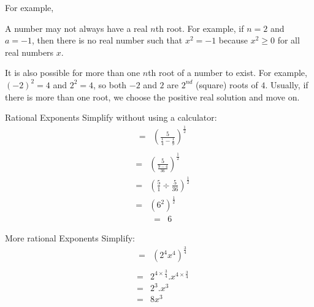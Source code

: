For example,

A number may not always have a real $n$th root. For example, if $n=2$ and
$a=-1$, then there is no real number such that $x^2=-1$ because $x^2 \geq 0 $ for all real numbers $x$.


It is also possible for more than one $n$th root of a number to exist. For example, $(-2)^2=4$ and $2^2=4$, so both $-2$ and $2$ are $2^{nd}$ (square) roots of $4$. Usually, if there is more than one root, we choose the positive real solution and move on.

\begin{wex}{Rational Exponents}
{Simplify without using a calculator: }{
\begin{eqnarray*}
&=&\left(\frac{5}{\frac{1}{4}-\frac{1}{9}}\right)^\frac{1}{2}\\
\end{eqnarray*}
\begin{eqnarray*}
&=&\left(\frac{5}{\frac{9-4}{36}}\right)^\frac{1}{2}\\
&=&\left(\frac{5}{1}\div \frac{5}{36}\right)^\frac{1}{2}\\
&=&(6^2)^\frac{1}{2}
\end{eqnarray*}
\begin{eqnarray*}
&=&6
\end{eqnarray*}
}
\end{wex}

\begin{wex}{More rational Exponents}
{Simplify: }
{
\begin{eqnarray*}
&=&(2^{4}x^{4})^{\frac{3}{4}}\\
\end{eqnarray*}
\begin{eqnarray*}
&=&2^{4\times{\frac{3}{4}}}.x^{4 \times{\frac{3}{4}}}\\
&=&2^3.x^3\\
&=&8x^3\\
\end{eqnarray*}
}
\end{wex}

